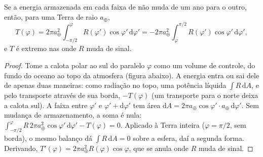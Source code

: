 \begin{proposition}\label{prop:b1:radiation-heat-transport:mht}
Se a energia armazenada em cada faixa de  não muda de um ano para o outro, então, para uma
Terra de raio $a_\oplus$,
\[
  T(\varphi) = 2\pi a_\oplus^2\int_{-\pi/2}^{\varphi} R(\varphi')\cos\varphi'\,
  \mathrm d\varphi' = -2\pi a_\oplus^2\int_{\varphi}^{\pi/2} R(\varphi')\cos
  \varphi'\,\mathrm d\varphi' ,
\]
e $T$ é extremo nas  onde $R$ muda de sinal.
\end{proposition}

\begin{proof}
Tome a calota polar ao sul do paralelo $\varphi$ como um volume de controle, do fundo do oceano ao
topo da atmosfera (figura abaixo). A energia entra ou sai dele de apenas duas maneiras: como
radiação no topo, uma potência líquida $\int R\,\mathrm dA$, e pelo transporte através de sua borda,
$-T(\varphi)$ (um transporte para o norte deixa a calota sul). A faixa entre $\varphi'$ e
$\varphi' + \mathrm d\varphi'$ tem área $\mathrm dA = 2\pi a_\oplus\cos\varphi'
\cdot a_\oplus\,\mathrm d\varphi'$. Sem mudança de armazenamento, a soma é nula:
$\int_{-\pi/2}^{\varphi} R\,2\pi a_\oplus^2\cos\varphi'\,\mathrm d\varphi' -
T(\varphi) = 0$. Aplicado à Terra inteira ($\varphi = \pi/2$, sem borda), o mesmo balanço dá
$\int R\,\mathrm dA = 0$ sobre a esfera, daí a segunda forma. Derivando, $T'(\varphi) = 2\pi a_\oplus^2 R(\varphi)\cos\varphi$, que se anula onde $R$ muda de sinal.
\end{proof}

